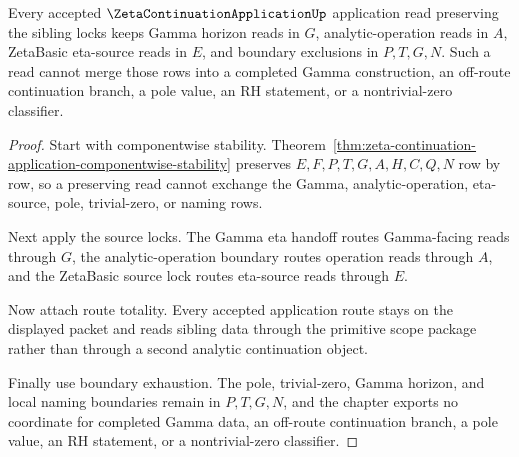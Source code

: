 \begin{theorem}
\label{thm:zeta-continuation-application-visible-boundary-lock}
Every accepted $\ZetaContinuationApplicationUp$ application read preserving the sibling locks keeps Gamma horizon reads in $G$, analytic-operation reads in $A$, ZetaBasic eta-source reads in $E$, and boundary exclusions in $P,T,G,N$. Such a read cannot merge those rows into a completed Gamma construction, an off-route continuation branch, a pole value, an RH statement, or a nontrivial-zero classifier.
\end{theorem}
\begin{proof}
Start with componentwise stability. Theorem~\ref{thm:zeta-continuation-application-componentwise-stability} preserves $E,F,P,T,G,A,H,C,Q,N$ row by row, so a preserving read cannot exchange the Gamma, analytic-operation, eta-source, pole, trivial-zero, or naming rows.

Next apply the source locks. The Gamma eta handoff routes Gamma-facing reads through $G$, the analytic-operation boundary routes operation reads through $A$, and the ZetaBasic source lock routes eta-source reads through $E$.

Now attach route totality. Every accepted application route stays on the displayed packet and reads sibling data through the primitive scope package rather than through a second analytic continuation object.

Finally use boundary exhaustion. The pole, trivial-zero, Gamma horizon, and local naming boundaries remain in $P,T,G,N$, and the chapter exports no coordinate for completed Gamma data, an off-route continuation branch, a pole value, an RH statement, or a nontrivial-zero classifier.
\end{proof}

